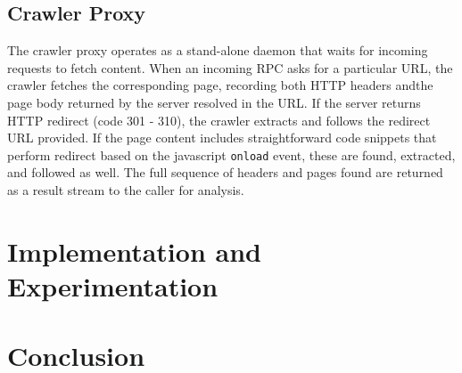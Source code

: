 \documentclass[letterpaper,twocolumn,10pt]{article}
\begin{document}
\subsection{Crawler Proxy}
The crawler proxy operates as a stand-alone daemon that waits for incoming requests to fetch content.  When an incoming RPC asks for a particular URL, the crawler fetches the corresponding page, recording both HTTP headers andthe page body returned by the server resolved in the URL.  If the server returns HTTP redirect (code 301 - 310), the crawler extracts and follows the redirect URL provided.  If the page content includes straightforward code snippets that perform redirect based on the javascript \texttt{onload} event, these are found, extracted, and followed as well.  The full sequence of headers and pages found are returned as a result stream to the caller for analysis.

\section{Implementation and Experimentation}

\section{Conclusion}

{
  \small
  
  
}
\end{document}
